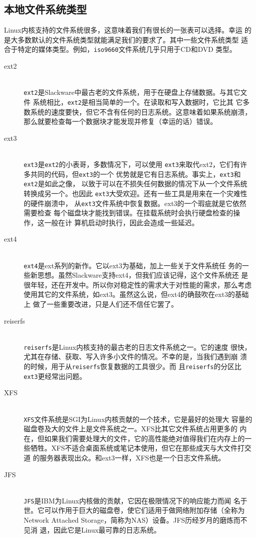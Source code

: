 \subsection{本地文件系统类型}
\label{sec:filesystemStructure:mouting:filesystemTypes}
Linux内核支持的文件系统很多，这意味着我们有很长的一张表可以选择。幸运
的是大多数默认的文件系统类型就能满足我们的要求了。其中一些文件系统类型
适合于特定的媒体类型。例如，\texttt{iso9660}文件系统几乎只用于CD和DVD
类型。
\begin{description}
\item[ext2] \hfill \\
  \texttt{ext2}是Slackware中最古老的文件系统，用于在硬盘上存储数据。与其它文件
  系统相比，\texttt{ext2}是相当简单的一个。在读取和写入数据时，它比其
  它多数系统的速度要快，但它不含有任何的日志系统。这意味着如果系统崩溃，
  那么就要检查每一个数据块才能发现并修复（幸运的话）错误。
\item[ext3] \hfill \\
  \texttt{ext3}是\texttt{ext2}的小表哥，多数情况下，可以使用
  \texttt{ext3}来取代ext2，它们有许多共同的代码，但\texttt{ext3}的一个
  优势就是它有日志系统。事实上，\texttt{ext3}和\texttt{ext2}是如此之像，
  以致于可以在不损失任何数据的情况下从一个文件系统转换成另一个。也因此
  \texttt{ext3}大受欢迎。还有一些工具是用来在一个灾难性的硬件崩溃中，
  从\texttt{ext3}文件系统中恢复数据。ext3的一个瑕疵就是它依然需要检查
  每个磁盘块才能找到错误。在挂载系统时会执行硬盘检查的操作，这一般在计
  算机启动时执行，因此会造成一些延迟。
\item[ext4] \hfill \\
  \texttt{ext4}是ext系列的新作。它以ext3为基础，加上一些关于文件系统任
  务的一些新思想。虽然Slackware支持ext4，但我们应该记得，这个文件系统还
  是很年轻，还在开发中。所以你对稳定性的需求大于对性能的需求，那么考虑
  使用其它的文件系统，如ext3。虽然这么说，但ext4的确鼓吹在ext3的基础上
  做了一些重要改进，只是人们还不信任它罢了。
\item[reiserfs] \hfill \\
  \texttt{reiserfs}是Linux内核支持的最古老的日志文件系统之一。它的速度
  很快，尤其在存储、获取、写入许多小文件的情况。不幸的是，当我们遇到崩
  溃的时候，用于从\texttt{reiserfs}恢复数据的工具很少。而
  且\texttt{reiserfs}的分区比\texttt{ext3}更经常出问题。
\item[XFS] \hfill \\
  \texttt{XFS}文件系统是SGI为Linux内核贡献的一个技术，它是最好的处理大
  容量的磁盘卷及大的文件上是文件系统之一。XFS比其它文件系统占用更多的
  内在，但如果我们需要处理大的文件，它的高性能绝对值得我们在内存上的一
  些牺牲。XFS不适合桌面系统或笔记本使用，但它在那些成天与大文件打交道
  的服务器表现出众。和ext3一样，XFS也是一个日志文件系统。
\item[JFS] \hfill \\
  \texttt{JFS}是IBM为Linux内核做的贡献，它因在极限情况下的响应能力而闻
  名于世。它可以作用于巨大的磁盘卷，使它们适用于做网络附加存储（全称为
  Network Attached Storage，简称为NAS）设备。JFS历经岁月的磨炼而不见消
  退，因此它是Linux最可靠的日志系统。


\end{description}
